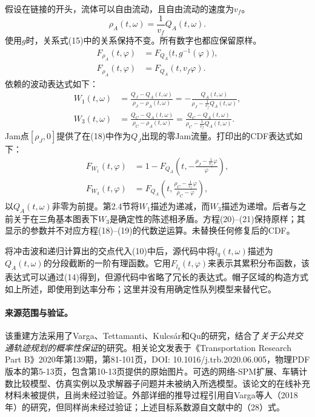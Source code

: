 \documentclass{article}
\begin{document}
假设在链接的开头，流体可以自由流动，且自由流动的速度为\(v_f\)。
\begin{equation}
\rho_A(t,\omega)=\frac{1}{v_f}Q_A(t,\omega).
\tag{15}
\end{equation}
使用\(g\)时，关系式(15)中的关系保持不变。所有数字也都应保留原样。
\begin{align}
F_{\rho_A}(t,\varphi)&=F_{Q_A}\bigl(t,g^{-1}(\varphi)\bigr), \tag{16}\\
F_{\rho_A}(t,\varphi)&=F_{Q_A}(t,v_f\varphi). \tag{17}
\end{align}
依赖的波动表达式如下：
\begin{align}
W_1(t,\omega)
&=\frac{Q_J-Q_A(t,\omega)}{\rho_J-\rho_A(t,\omega)}
=-\frac{Q_A(t,\omega)}{\rho_J-\frac{1}{v_f}Q_A(t,\omega)}, \tag{18}\\
W_3(t,\omega)
&=\frac{Q_C-Q_A(t,\omega)}{\rho_C-\rho_A(t,\omega)}
=\frac{Q_C-Q_A(t,\omega)}{\rho_C-\frac{1}{v_f}Q_A(t,\omega)}. \tag{19}
\end{align}
Jam点\([\rho_J,0]\)提供了在(18)中作为\(Q_J\)出现的零Jam流量。打印出的CDF表达式如下：
\begin{align}
F_{W_1}(t,\varphi)
&=1-F_{Q_A}\left(t,-\frac{\rho_J-\frac{1}{v_f}\varphi}{\varphi}\right), \tag{20}\\
F_{W_3}(t,\varphi)
&=F_{Q_A}\left(t,\frac{\rho_C-\frac{1}{v_f}\varphi}{\rho_C-\varphi}\right), \tag{21}
\end{align}
以\(Q_A(t,\omega)\)非零为前提。第2.4节将\(W_1\)描述为递减，而\(W_3\)描述为递增。后者与之前关于在三角基本图表下\(W_3\)是确定性的陈述相矛盾。方程(20)--(21)保持原样；其显示的参数并不对应方程(18)--(19)的代数逆运算。未替换任何修复后的CDF。

将冲击波和递归计算出的交点代入(10)中后，源代码中将\(l_q(t,\omega)\)描述为\(Q_A(t,\omega)\)的分段截断的一阶有理函数。它用\(F_{l_q}(t,\varphi)\)来表示其累积分布函数，该表达式可以通过(14)得到，但源代码中省略了冗长的表达式。帽子区域的构造方式如上所述，即使用到达率分布；这里并没有用确定性队列模型来替代它。

\paragraph{来源范围与验证。}
该重建方法采用了Varga、Tettamanti、Kulcs\'ar和Qu的研究，结合了\emph{关于公共交通轨迹规划的概率性保证}的研究。相关论文发表于《Transportation Research Part B》2020年第139期，第81-101页，DOI: 10.1016/j.trb.2020.06.005，物理PDF版本的第5-13页，包含第10-13页提供的原始图片。可选的网络-SPM扩展、车辆计数比较模型、仿真实例以及求解器子问题并未被纳入所选模型。该论文的在线补充材料未被提供，且尚未经过验证。外部详细的推导过程引用自Varga等人（2018年）的研究，但同样尚未经过验证；上述目标系数源自文献中的（28）式。
\end{document}
